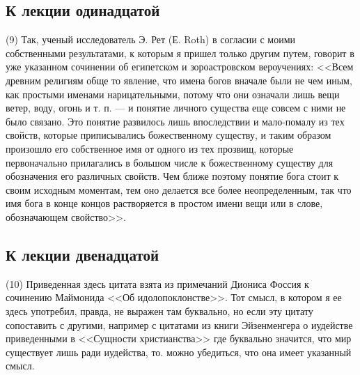\documentclass[12pt]{article}
\begin{document}
\subsection*{К лекции одинадцатой} 

(9) Так, ученый исследователь Э. Рет (Е. Roth) в согласии с моими собственными результатами, к которым я пришел только другим путем, говорит в уже указанном сочинении об египетском и зороастровском вероучениях: <<Всем древним религиям обще то явление, что имена богов вначале были не чем иным, как простыми именами нарицательными, потому что они означали лишь вещи ветер, воду, огонь и т. п. --- и понятие личного существа еще совсем с ними не было связано. Это понятие развилось лишь впоследствии и мало-помалу из тех свойств, которые приписывались божественному существу, и таким образом произошло его собственное имя от одного из тех прозвищ, которые первоначально прилагались в большом числе к божественному существу для обозначения его различных свойств. Чем ближе поэтому понятие бога стоит к своим исходным моментам, тем оно делается все более неопределенным, так что имя бога в конце концов растворяется в простом имени вещи или в слове, обозначающем свойство>>. 

\subsection*{К лекции двенадцатой} 

(10) Приведенная здесь цитата взята из примечаний Диониса Фоссия к сочинению Маймонида <<Об идолопоклонстве>>. Тот смысл, в котором я ее здесь употребил, правда, не выражен там буквально, но если эту цитату сопоставить с другими, например с цитатами из книги Эйзенменгера о иудействе приведенными в <<Сущности христианства>>  где буквально значится, что мир существует лишь ради иудейства, то. можно убедиться, что она имеет указанный смысл. 
\end{document}
